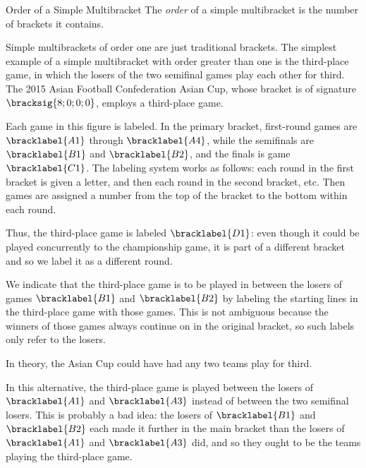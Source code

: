 {    \begin{definition}{Order of a Simple Multibracket}{}
        The \textit{order} of a simple multibracket is the number of brackets it contains.
    \end{definition}

    Simple multibrackets of order one are just traditional brackets. The simplest example of a simple multibracket with order greater than one is the third-place game, in which the losers of the two semifinal games play each other for third. The 2015 Asian Football Confederation Asian Cup, whose bracket is of signature $\bracksig{8; 0; 0; 0}$, employs a third-place game.


    Each game in this figure is labeled. In the primary bracket, first-round games are $\bracklabel{A1}$ through $\bracklabel{A4}$, while the semifinals are $\bracklabel{B1}$ and $\bracklabel{B2}$, and the finals is game $\bracklabel{C1}$. The labeling system works as follows: each round in the first bracket is given a letter, and then each round in the second bracket, etc. Then games are assigned a number from the top of the bracket to the bottom within each round.
    
    Thus, the third-place game is labeled $\bracklabel{D1}$: even though it could be played concurrently to the championship game, it is part of a different bracket and so we label it as a different round.

    We indicate that the third-place game is to be played in between the losers of games $\bracklabel{B1}$ and $\bracklabel{B2}$ by labeling the starting lines in the third-place game with those games. This is not ambiguous because the winners of those games always continue on in the original bracket, so such labels only refer to the losers. 
    
    In theory, the Asian Cup could have had any two teams play for third.


    In this alternative, the third-place game is played between the losers of $\bracklabel{A1}$ and $\bracklabel{A3}$ instead of between the two semifinal losers. This is probably a bad idea: the losers of $\bracklabel{B1}$ and $\bracklabel{B2}$ each made it further in the main bracket than the losers of $\bracklabel{A1}$ and $\bracklabel{A3}$ did, and so they ought to be the teams playing the third-place game.

}
